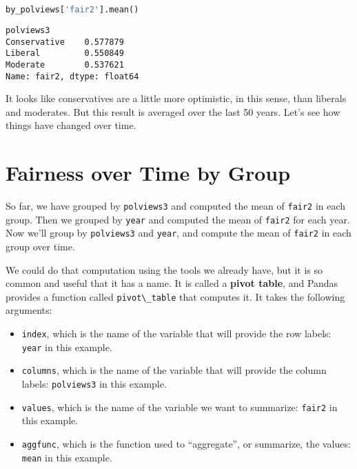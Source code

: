 \begin{lstlisting}[language=Python,style=source]
by_polviews['fair2'].mean()
\end{lstlisting}

\begin{lstlisting}[style=output]
polviews3
Conservative    0.577879
Liberal         0.550849
Moderate        0.537621
Name: fair2, dtype: float64
\end{lstlisting}

It looks like conservatives are a little more optimistic, in this sense,
than liberals and moderates. But this result is averaged over the last
50 years. Let's see how things have changed over time.

\section{Fairness over Time by Group}\label{fairness-over-time-by-group}

So far, we have grouped by \passthrough{\lstinline!polviews3!} and
computed the mean of \passthrough{\lstinline!fair2!} in each group. Then
we grouped by \passthrough{\lstinline!year!} and computed the mean of
\passthrough{\lstinline!fair2!} for each year. Now we'll group by
\passthrough{\lstinline!polviews3!} and \passthrough{\lstinline!year!},
and compute the mean of \passthrough{\lstinline!fair2!} in each group
over time.

We could do that computation using the tools we already have, but it is
so common and useful that it has a name. It is called a \textbf{pivot
table}, and Pandas provides a function called
\passthrough{\lstinline!pivot\_table!} that computes it. It takes the
following arguments:

\begin{itemize}
\item
  \passthrough{\lstinline!index!}, which is the name of the variable
  that will provide the row labels: \passthrough{\lstinline!year!} in
  this example.
\item
  \passthrough{\lstinline!columns!}, which is the name of the variable
  that will provide the column labels:
  \passthrough{\lstinline!polviews3!} in this example.
\item
  \passthrough{\lstinline!values!}, which is the name of the variable we
  want to summarize: \passthrough{\lstinline!fair2!} in this example.
\item
  \passthrough{\lstinline!aggfunc!}, which is the function used to
  ``aggregate'', or summarize, the values:
  \passthrough{\lstinline!mean!} in this example.
\end{itemize}

